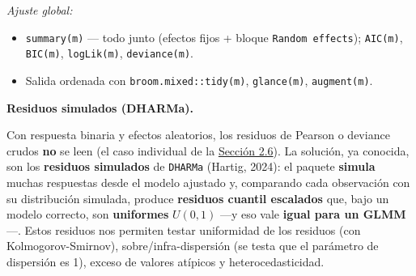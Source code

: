 \documentclass[
  letterpaper,
  DIV=11,
  numbers=noendperiod]{scrartcl}
\providecommand{\tightlist}{%
  \setlength{\itemsep}{0pt}\setlength{\parskip}{0pt}}\usepackage{longtable,booktabs,array}
\begin{document}
\begin{tcolorbox}
\emph{Ajuste global:}

\begin{itemize}
\tightlist
\item
  \texttt{summary(m)} --- todo junto (efectos fijos + bloque
  \texttt{Random\ effects}); \texttt{AIC(m)}, \texttt{BIC(m)},
  \texttt{logLik(m)}, \texttt{deviance(m)}.
\item
  Salida ordenada con \texttt{broom.mixed::tidy(m)}, \texttt{glance(m)},
  \texttt{augment(m)}.
\end{itemize}

\end{tcolorbox}

\textbf{Residuos simulados (DHARMa).}

Con respuesta binaria y efectos aleatorios, los residuos de Pearson o
deviance crudos \textbf{no} se leen (el caso individual de la
\protect\hyperlink{sec-u12-diagnostico}{Sección 2.6}). La solución, ya
conocida, son los \textbf{residuos simulados} de \texttt{DHARMa}
(Hartig, 2024): el paquete \textbf{simula} muchas respuestas desde el
modelo ajustado y, comparando cada observación con su distribución
simulada, produce \textbf{residuos cuantil escalados} que, bajo un
modelo correcto, son \textbf{uniformes} \(U(0,1)\) ---y eso vale
\textbf{igual para un GLMM}---. Estos residuos nos permiten testar
uniformidad de los residuos (con Kolmogorov-Smirnov),
sobre/infra-dispersión (se testa que el parámetro de dispersión es 1),
exceso de valores atípicos y heterocedasticidad.
\end{document}
